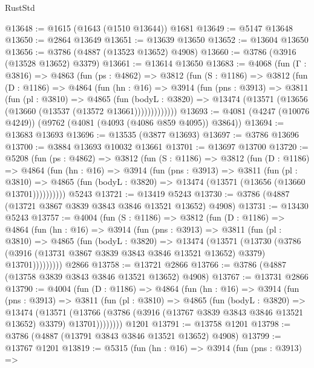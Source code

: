\begin{lexlean}{RustStd}
\begin{coremodule}
@13648 := @1615 (@1643 (@1510 @13644)) @1681
@13649 := @5147 @13648
@13650 := @2864 @13649
@13651 := @13639 @13650
@13652 := @13604 @13650
@13656 := @3786 (@4887 (@13523 @13652) @4908)
@13660 := @3786 (@3916 (@13528 @13652) @3379)
@13661 := @13614 @13650
@13683 := @4068
    (fun (Γ : @3816) =>
    @4863
      (fun (ps : @4862) =>
      @3812
        (fun (S : @1186) =>
        @3812
          (fun (D : @1186) =>
          @4864
            (fun (hn : @16) =>
            @3914
              (fun (pns : @3913) =>
              @3811
                (fun (pl : @3810) =>
                @4865
                  (fun (bodyL : @3820) =>
                  @13474 (@13571 (@13656 (@13660 (@13537 (@13572 @13661)))))))))))))
@13693 := @4081 (@4247 (@10076 @4249)) (@9762 (@4081 (@4093 (@4086 @859 @4095)) @3864))
@13694 := @13683 @13693
@13696 := @13535 (@3877 @13693)
@13697 := @3786 @13696
@13700 := @3884 @13693 @10032 @13661
@13701 := @13697 @13700
@13720 := @5208
    (fun (ps : @4862) =>
    @3812
      (fun (S : @1186) =>
      @3812
        (fun (D : @1186) =>
        @4864
          (fun (hn : @16) =>
          @3914
            (fun (pns : @3913) =>
            @3811
              (fun (pl : @3810) =>
              @4865 (fun (bodyL : @3820) => @13474 (@13571 (@13656 (@13660 @13701))))))))))
    @5243
@13721 := @13419 @5243
@13730 := @3786 (@4887 (@13721 @3867 @3839 @3843 @3846 @13521 @13652) @4908)
@13731 := @13430 @5243
@13757 := @4004
    (fun (S : @1186) =>
    @3812
      (fun (D : @1186) =>
      @4864
        (fun (hn : @16) =>
        @3914
          (fun (pns : @3913) =>
          @3811
            (fun (pl : @3810) =>
            @4865
              (fun (bodyL : @3820) =>
              @13474
                (@13571
                  (@13730
                    (@3786
                      (@3916 (@13731 @3867 @3839 @3843 @3846 @13521 @13652) @3379)
                      @13701)))))))))
    @2866
@13758 := @13721 @2866
@13766 := @3786 (@4887 (@13758 @3839 @3843 @3846 @13521 @13652) @4908)
@13767 := @13731 @2866
@13790 := @4004
    (fun (D : @1186) =>
    @4864
      (fun (hn : @16) =>
      @3914
        (fun (pns : @3913) =>
        @3811
          (fun (pl : @3810) =>
          @4865
            (fun (bodyL : @3820) =>
            @13474
              (@13571
                (@13766 (@3786 (@3916 (@13767 @3839 @3843 @3846 @13521 @13652) @3379) @13701))))))))
    @1201
@13791 := @13758 @1201
@13798 := @3786 (@4887 (@13791 @3843 @3846 @13521 @13652) @4908)
@13799 := @13767 @1201
@13819 := @5315
    (fun (hn : @16) =>
    @3914
      (fun (pns : @3913) =>

\end{coremodule}
\end{lexlean}
